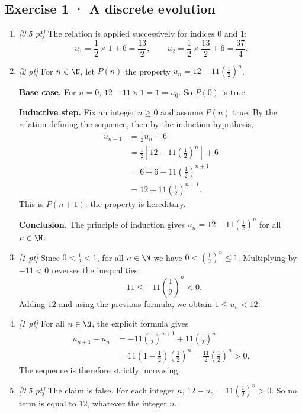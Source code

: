 \subsection*{Exercise 1 · A discrete evolution}\begin{enumerate}

\item \textit{[0.5 pt]} The relation is applied successively for indices $0$ and $1$:\[u_1=\frac{1}{2}\times 1+6=\frac{13}{2},\qquad u_2=\frac{1}{2}\times \frac{13}{2}+6=\frac{37}{4}.\]

\item \textit{[2 pt]} For $n\in\N$, let $P(n)$ the property $u_n=12-11\left(\frac{1}{2}\right)^n$.
\par\smallskip\textbf{Base case.} For $n=0$, $12-11\times1=1=u_0$. So $P(0)$ is true.
\par\smallskip\textbf{Inductive step.} Fix an integer $n\ge0$ and assume $P(n)$ true. By the relation defining the sequence, then by the induction hypothesis,
\[\begin{aligned}u_{n+1}&=\frac{1}{2}u_n+6\\
&=\frac{1}{2}\left[12-11\left(\frac{1}{2}\right)^n\right]+6\\
&=6+6-11\left(\frac{1}{2}\right)^{n+1}\\
&=12-11\left(\frac{1}{2}\right)^{n+1}.
\end{aligned}\]
This is $P(n+1)$: the property is hereditary.
\par\smallskip\textbf{Conclusion.} The principle of induction gives $u_n=12-11\left(\frac{1}{2}\right)^n$ for all $n\in\N$.

\item \textit{[1 pt]} Since $0<\frac{1}{2}<1$, for all $n\in\N$ we have $0<(\frac{1}{2})^n\le1$. Multiplying by $-11<0$ reverses the inequalities:
\[-11\le-11(\frac{1}{2})^n<0.\]
Adding $12$ and using the previous formula, we obtain $1\le u_n<12$.

\item \textit{[1 pt]} For all $n\in\N$, the explicit formula gives
\[\begin{aligned}u_{n+1}-u_n&=-11(\frac{1}{2})^{n+1}+11(\frac{1}{2})^n\\&=11(1-\frac{1}{2})(\frac{1}{2})^n=\frac{11}{2}(\frac{1}{2})^n>0.\end{aligned}\]
The sequence is therefore strictly increasing.

\item \textit{[0.5 pt]} The claim is false. For each integer $n$, $12-u_n=11(\frac{1}{2})^n>0$. So no term is equal to $12$, whatever the integer $n$.

\end{enumerate}

